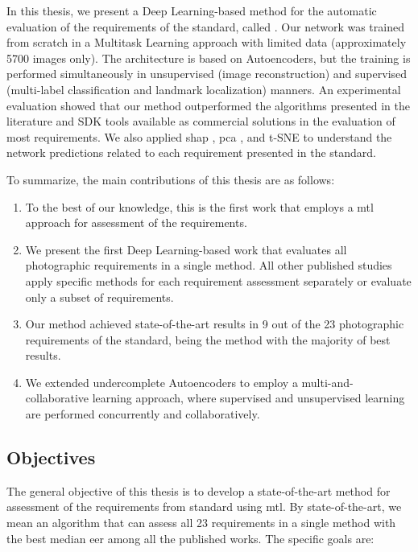 In this thesis, we present a Deep Learning-based method for the automatic evaluation of the requirements of the \icao standard, called \methodname. Our network was trained from scratch in a Multitask Learning approach with limited data (approximately 5700 images only). The architecture is based on Autoencoders, but the training is performed simultaneously in unsupervised (image reconstruction) and supervised (multi-label classification and landmark localization) manners. An experimental evaluation showed that our method outperformed the algorithms presented in the literature and SDK tools available as commercial solutions in the evaluation of most requirements. We also applied \acf{shap} \citep{shap2018}, \acf{pca} \citep{pca}, and t-SNE \citep{tsne} to understand the network predictions related to each requirement presented in the \icao standard.
 
To summarize, the main contributions of this thesis are as follows:
\begin{enumerate}
\item To the best of our knowledge, this is the first work that employs a \acl{mtl} approach for assessment of the \icao requirements.
 
\item We present the first Deep Learning-based work that evaluates all photographic requirements in a single method. All other published studies apply specific methods for each requirement assessment separately or evaluate only a subset of requirements.
 
\item Our method achieved state-of-the-art results in 9 out of the 23 photographic requirements of the \icao standard, being the method with the majority of best results.
 
\item We extended undercomplete Autoencoders to employ a multi-and-collaborative learning approach, where supervised and unsupervised learning are performed concurrently and collaboratively.
\end{enumerate}
 
\subsection{Objectives}	
 
The general objective of this thesis is to develop a state-of-the-art method for assessment of the requirements from \icao standard using \acl{mtl}. By state-of-the-art, we mean an algorithm that can assess all 23 requirements in a single method with the best median \acs{eer} among all the published works. The specific goals are:
 
